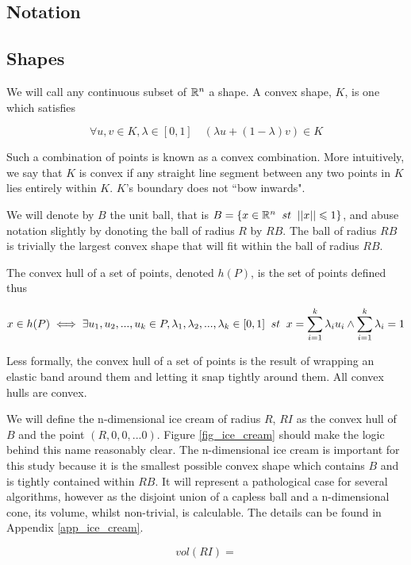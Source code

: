 \subsection{Notation}

\subsection{Shapes}

We will call any continuous subset of $\mathbb{R}^{n}$ a shape. A convex shape, $K$, is one which satisfies

$$
\forall u, v \in K, \lambda \in [0,1] \quad (\lambda u + (1-\lambda) v) \in K
$$

Such a combination of points is known as a convex combination. More intuitively, we say that $K$ is convex if any straight line segment between any two points in $K$ lies entirely within $K$. $K$'s boundary does not ``bow inwards".

We will denote by $B$ the unit ball, that is $B = \{x \in \mathbb{R}^n \;\; st \;\; ||x|| \leqslant 1\}$, and abuse notation slightly by donoting the ball of radius $R$ by $RB$. The ball of radius $RB$ is trivially the largest convex shape that will fit within the ball of radius $RB$.

The convex hull of a set of points, denoted $h(P)$, is the set of points defined thus

$$
x \in h(P) \iff \exists u_1, u_2,...,u_k \in P, \lambda_1, \lambda_2, ..., \lambda_k  \in [0,1] \;\; st \;\; x = \sum^{k}_{i=1} \lambda_i u_i \wedge \sum^{k}_{i=1} \lambda_i = 1
$$

Less formally, the convex hull of a set of points is the result of wrapping an elastic band around them and letting it snap tightly around them. All convex hulls are convex.

We will define the n-dimensional ice cream of radius $R$, $RI$ as the convex hull of $B$ and the point $(R,0,0,...0)$. Figure \ref{fig_ice_cream} should make the logic behind this name reasonably clear. The n-dimensional ice cream is important for this study because it is the smallest possible convex shape which contains $B$ and is tightly contained within $RB$. It will represent a pathological case for several algorithms, however as the disjoint union of a capless ball and a n-dimensional cone, its volume, whilst non-trivial, is calculable. The details can be found in Appendix \ref{app_ice_cream}.

$$
vol(RI) = %
$$

